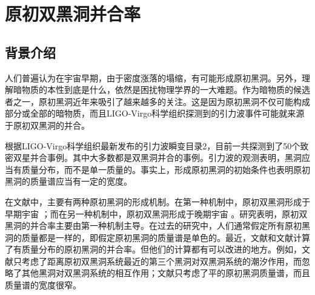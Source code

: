 \chapter{原初双黑洞并合率}\label{chap:mergerrate}

\section{背景介绍}


人们普遍认为在宇宙早期，由于密度涨落的塌缩，有可能形成原初黑洞\cite{Hawking:1971ei,Carr:1974nx,Carr:1975qj}。另外，理解暗物质的本性到底是什么，依然是困扰物理学界的一大难题。作为暗物质的候选者之一，原初黑洞近年来吸引了越来越多的关注。这是因为原初黑洞不仅可能构成部分或全部的暗物质，而且LIGO-Virgo科学组织探测到的引力波事件\cite{Abbott:2016blz}可能就来源于原初双黑洞的并合\cite{Sasaki:2016jop,Bird:2016dcv}。

根据LIGO-Virgo科学组织最新发布的引力波瞬变目录2\cite{Abbott:2020niy}，目前一共探测到了50个致密双星并合事例。其中大多数都是双黑洞并合的事例。引力波的观测表明，黑洞应当有质量分布，而不是单一质量的。事实上，形成原初黑洞的初始条件也表明原初黑洞的质量谱应当有一定的宽度。

在文献中，主要有两种原初黑洞的形成机制。在第一种机制中，原初双黑洞形成于早期宇宙 \cite{Sasaki:2016jop,Nakamura:1997sm,Ali-Haimoud:2017rtz}；而在另一种机制中，原初双黑洞形成于晚期宇宙 \cite{Bird:2016dcv,Ali-Haimoud:2017rtz,Nishikawa:2017chy}。研究表明，原初双黑洞的并合率主要由第一种机制主导。在过去的研究中，人们通常假定所有原初黑洞的质量都是一样的，即假定原初黑洞的质量谱是单色的\cite{Sasaki:2016jop,Nakamura:1997sm,Ali-Haimoud:2017rtz,Bird:2016dcv,Nishikawa:2017chy}。最近，文献\cite{Raidal:2017mfl}和文献\cite{Kocsis:2017yty}计算了有质量分布的原初黑洞的并合率。但他们的计算都有可以改进的地方。例如，文献\cite{Raidal:2017mfl}只考虑了距离原初双黑洞系统最近的第三个黑洞对双黑洞系统的潮汐作用，而忽略了其他黑洞对双黑洞系统的相互作用；文献\cite{Kocsis:2017yty}只考虑了平的原初黑洞质量谱，而且质量谱的宽度很窄。

